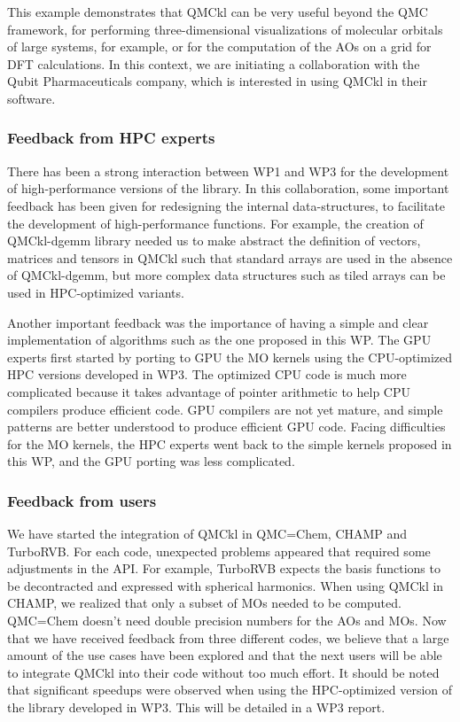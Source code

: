 This example demonstrates that QMCkl can be very useful beyond the \ac{QMC}
framework, for performing three-dimensional visualizations of molecular
orbitals of large systems, for example, or for the computation of the
\acp{AO} on a grid for \ac{DFT} calculations. In this context, we are
initiating a collaboration with the Qubit Pharmaceuticals company,
which is interested in using QMCkl in their software.

\subsubsection{Feedback from HPC experts}

There has been a strong interaction between WP1 and WP3 for the
development of high-performance versions of the library. In this
collaboration, some important feedback has been given for redesigning
the internal data-structures, to facilitate the development of
high-performance functions.
For example, the creation of QMCkl-dgemm library needed us to make abstract the
definition of vectors, matrices and tensors in QMCkl such that standard
arrays are used in the absence of QMCkl-dgemm, but more complex data
structures such as tiled arrays can be used in HPC-optimized variants.

Another important feedback was the importance of having a simple and clear
implementation of algorithms such as the one proposed in this \ac{WP}.
The GPU experts first started by porting to GPU the \ac{MO} kernels
using the CPU-optimized HPC versions developed in WP3. The optimized CPU code
is much more complicated because it takes advantage of pointer arithmetic to help
CPU compilers produce efficient code. GPU compilers are not yet mature, and simple
patterns are better understood to produce efficient GPU code. Facing difficulties
for the \ac{MO} kernels, the HPC experts went back to the simple kernels
proposed in this \ac{WP}, and the GPU porting was less complicated.


\subsubsection{Feedback from users}

We have started the integration of QMCkl in QMC=Chem, CHAMP and
TurboRVB. For each code, unexpected problems appeared that required some
adjustments in the \ac{API}. For example, TurboRVB expects the basis functions
to be decontracted and expressed with spherical harmonics.
When using QMCkl in CHAMP, we realized that only a subset of \acp{MO}
needed to be computed. QMC=Chem doesn't need double precision numbers for the
\acp{AO} and \acp{MO}. Now that we have received feedback from three different
codes, we believe that a large amount of the use cases have been explored and that the
next users will be able to integrate QMCkl into their code without too much
effort. It should be noted that significant speedups were observed when using
the HPC-optimized version of the library developed in WP3. This will be detailed
in a WP3 report.

